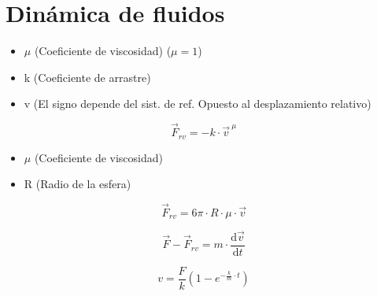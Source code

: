 \section{Dinámica de fluidos}
    \begin{itemize}
        \item $\mu$ (Coeficiente de viscosidad) ($\mu = 1$)
        \item k (Coeficiente de arrastre)
        \item v (El signo depende del sist. de ref. Opuesto al desplazamiento relativo)
    \end{itemize}
    \begin{equation}
        \vec{F}_{rv} = -k \cdot \vec{v}^{\ \mu}
    \end{equation}
    
    \begin{itemize}
        \item $\mu$ (Coeficiente de viscosidad)
        \item R (Radio de la esfera)
    \end{itemize}
    \begin{equation}
        \vec{F}_{rv} = 6\pi \cdot R \cdot \mu \cdot \vec{v} 
    \end{equation}
    
    \begin{equation}
        \vec{F} - \vec{F}_{rv} = m \cdot \frac{\mathrm{d}\vec{v}}{\mathrm{d}t}
    \end{equation}
    
    \begin{equation}
        v = \frac{F}{k} \left(1-e^{-\frac{k}{m}\cdot t}\right)
    \end{equation}
